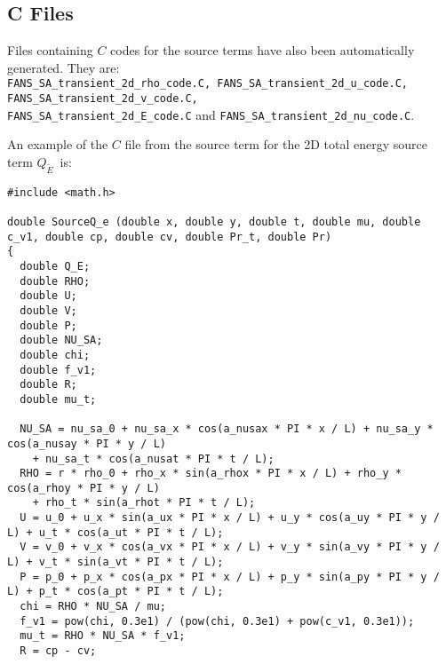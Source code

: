 \documentclass[10pt]{article}
\newcommand{\tE}{\tilde{E}}
\begin{document}
\subsection{C Files}Files containing $C$ codes for the source terms have also been automatically generated. They are:\\ \texttt{FANS\_SA\_transient\_2d\_rho\_code.C, FANS\_SA\_transient\_2d\_u\_code.C, FANS\_SA\_transient\_2d\_v\_code.C,\\ FANS\_SA\_transient\_2d\_E\_code.C} and \texttt{FANS\_SA\_transient\_2d\_nu\_code.C}.

An example of the $C$ file from the source term for the 2D total energy source term $Q_{\tE}$~is:

\begin{footnotesize}
\begin{verbatim}
#include <math.h>

double SourceQ_e (double x, double y, double t, double mu, double c_v1, double cp, double cv, double Pr_t, double Pr)
{
  double Q_E;
  double RHO;
  double U;
  double V;
  double P;
  double NU_SA;
  double chi;
  double f_v1;
  double R;
  double mu_t;

  NU_SA = nu_sa_0 + nu_sa_x * cos(a_nusax * PI * x / L) + nu_sa_y * cos(a_nusay * PI * y / L)
    + nu_sa_t * cos(a_nusat * PI * t / L);
  RHO = r * rho_0 + rho_x * sin(a_rhox * PI * x / L) + rho_y * cos(a_rhoy * PI * y / L)
    + rho_t * sin(a_rhot * PI * t / L);
  U = u_0 + u_x * sin(a_ux * PI * x / L) + u_y * cos(a_uy * PI * y / L) + u_t * cos(a_ut * PI * t / L);
  V = v_0 + v_x * cos(a_vx * PI * x / L) + v_y * sin(a_vy * PI * y / L) + v_t * sin(a_vt * PI * t / L);
  P = p_0 + p_x * cos(a_px * PI * x / L) + p_y * sin(a_py * PI * y / L) + p_t * cos(a_pt * PI * t / L);
  chi = RHO * NU_SA / mu;
  f_v1 = pow(chi, 0.3e1) / (pow(chi, 0.3e1) + pow(c_v1, 0.3e1));
  mu_t = RHO * NU_SA * f_v1;
  R = cp - cv;


\end{verbatim}
\end{footnotesize}
\end{document}
